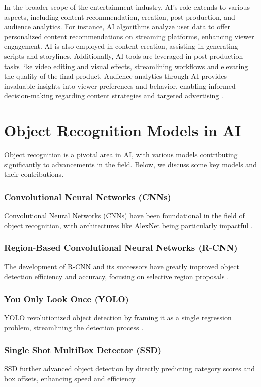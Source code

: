 In the broader scope of the entertainment industry, AI's role extends to various aspects, including content recommendation, creation, post-production, and audience analytics. For instance, AI algorithms analyze user data to offer personalized content recommendations on streaming platforms, enhancing viewer engagement. AI is also employed in content creation, assisting in generating scripts and storylines. Additionally, AI tools are leveraged in post-production tasks like video editing and visual effects, streamlining workflows and elevating the quality of the final product. Audience analytics through AI provides invaluable insights into viewer preferences and behavior, enabling informed decision-making regarding content strategies and targeted advertising \autocite{WebisoftEntAI}.

\section{Object Recognition Models in AI}

Object recognition is a pivotal area in AI, with various models contributing significantly to advancements in the field. Below, we discuss some key models and their contributions.

\subsubsection{Convolutional Neural Networks (CNNs)}
Convolutional Neural Networks (CNNs) have been foundational in the field of object recognition, with architectures like AlexNet being particularly impactful \cite{Krizhevsky2012}.

\subsubsection{Region-Based Convolutional Neural Networks (R-CNN)}
The development of R-CNN and its successors have greatly improved object detection efficiency and accuracy, focusing on selective region proposals \cite{Girshick2014}.

\subsubsection{You Only Look Once (YOLO)}
YOLO revolutionized object detection by framing it as a single regression problem, streamlining the detection process \cite{Redmon2016}.

\subsubsection{Single Shot MultiBox Detector (SSD)}
SSD further advanced object detection by directly predicting category scores and box offsets, enhancing speed and efficiency \cite{Liu2016}.

